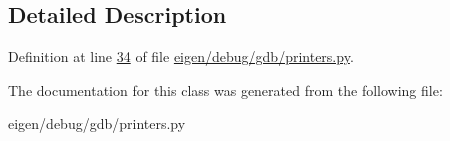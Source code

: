 \subsection{Detailed Description}


Definition at line \hyperlink{eigen_2debug_2gdb_2printers_8py_source_l00034}{34} of file \hyperlink{eigen_2debug_2gdb_2printers_8py_source}{eigen/debug/gdb/printers.\+py}.



The documentation for this class was generated from the following file\+:\begin{DoxyCompactItemize}
\item 
eigen/debug/gdb/printers.\+py\end{DoxyCompactItemize}
